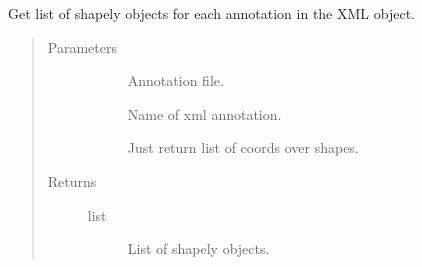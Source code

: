 \documentclass[letterpaper,10pt,english]{sphinxmanual}
\begin{document}
\begin{fulllineitems}
\label{\detokenize{index:pathflowai.utils.parse_coord_return_boxes}}
Get list of shapely objects for each annotation in the XML object.
\begin{quote}\begin{description}
\item[{Parameters}] \leavevmode\begin{description}
\item[{}] \leavevmode
Annotation file.

\item[{}] \leavevmode
Name of xml annotation.

\item[{}] \leavevmode
Just return list of coords over shapes.

\end{description}

\item[{Returns}] \leavevmode\begin{description}
\item[{list}] \leavevmode
List of shapely objects.

\end{description}

\end{description}\end{quote}

\end{fulllineitems}

\end{document}
